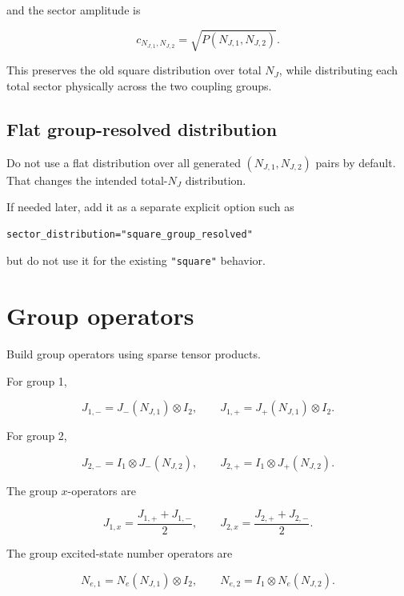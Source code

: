 \documentclass[11pt]{article}
\begin{document}
and the sector amplitude is

\begin{equation}
c_{N_{J,1},N_{J,2}}
=
\sqrt{P(N_{J,1},N_{J,2})}.
\end{equation}

This preserves the old square distribution over total \(N_J\), while
distributing each total sector physically across the two coupling groups.

\subsection*{Flat group-resolved distribution}

Do not use a flat distribution over all generated \((N_{J,1},N_{J,2})\) pairs by
default. That changes the intended total-\(N_J\) distribution.

If needed later, add it as a separate explicit option such as

\begin{verbatim}
sector_distribution="square_group_resolved"
\end{verbatim}

but do not use it for the existing \texttt{"square"} behavior.

\section*{Group operators}

Build group operators using sparse tensor products.

For group 1,

\begin{equation}
J_{1,-}=J_-(N_{J,1})\otimes I_2,
\qquad
J_{1,+}=J_+(N_{J,1})\otimes I_2.
\end{equation}

For group 2,

\begin{equation}
J_{2,-}=I_1\otimes J_-(N_{J,2}),
\qquad
J_{2,+}=I_1\otimes J_+(N_{J,2}).
\end{equation}

The group \(x\)-operators are

\begin{equation}
J_{1,x}=\frac{J_{1,+}+J_{1,-}}{2},
\qquad
J_{2,x}=\frac{J_{2,+}+J_{2,-}}{2}.
\end{equation}

The group excited-state number operators are

\begin{equation}
N_{e,1}=N_e(N_{J,1})\otimes I_2,
\qquad
N_{e,2}=I_1\otimes N_e(N_{J,2}).
\end{equation}
\end{document}
